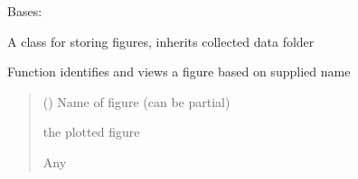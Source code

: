 \documentclass[letterpaper,10pt,english]{sphinxmanual}
\begin{document}
\begin{fulllineitems}
\label{\detokenize{Organization:Organization.Figures}}
\pysigstartsignatures
{}
\pysigstopsignatures
\sphinxAtStartPar
Bases: {\hyperref[\detokenize{Organization:Organization.Data}]{}}

\sphinxAtStartPar
A class for storing figures, inherits collected data folder

\begin{fulllineitems}
\label{\detokenize{Organization:Organization.Figures.view_figure}}
\pysigstartsignatures
{}
\pysigstopsignatures
\sphinxAtStartPar
Function identifies and views a figure based on supplied name
\begin{quote}\begin{description}
\sphinxAtStartPar
{} () \textendash{} Name of figure (can be partial)

\sphinxAtStartPar
the plotted figure

\sphinxAtStartPar
Any

\end{description}\end{quote}

\end{fulllineitems}


\end{fulllineitems}

\end{document}
